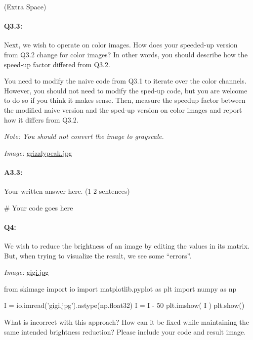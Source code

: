 \documentclass[11pt]{article}
\begin{document}
 (Extra Space)


\pagebreak
\paragraph{Q3.3:} Next, we wish to operate on color images. How does your speeded-up version from Q3.2 change for color images? In other words, you should describe how the speed-up factor differed from Q3.2.

You need to modify the naive code from Q3.1 to iterate over the color channels. However, you should not need to modify the sped-up code, but you are welcome to do so if you think it makes sense. Then, measure the speedup factor between the modified naive version and the sped-up version on color images and report how it differs from Q3.2.

\emph{Note: You should not convert the image to grayscale.}

\emph{Image:} \href{grizzlypeak.jpg}{grizzlypeak.jpg}

\paragraph{A3.3:} Your written answer here. (1-2 sentences)


\begin{python}
# Your code goes here
\end{python}



\pagebreak
\paragraph{Q4:} We wish to reduce the brightness of an image by editing the values in its matrix. But, when trying to visualize the result, we see some ``errors''.

\emph{Image:} \href{gigi.jpg}{gigi.jpg}

\begin{python}
from skimage import io
import matplotlib.pyplot as plt
import numpy as np

I =  io.imread('gigi.jpg').astype(np.float32)
I = I - 50
plt.imshow( I )
plt.show()
\end{python}

What is incorrect with this approach? How can it be fixed while maintaining the same intended brightness reduction? Please include your code and result image.
\end{document}
